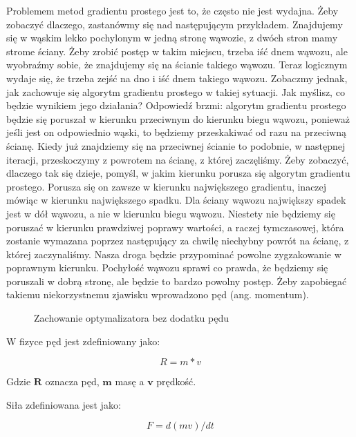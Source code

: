 Problemem metod gradientu prostego jest to, że często nie jest wydajna. Żeby zobaczyć dlaczego, zastanówmy się nad następującym przykładem. Znajdujemy się w wąskim lekko pochylonym w jedną stronę wąwozie, z dwóch stron mamy strome ściany. Żeby zrobić postęp w takim miejscu, trzeba iść dnem wąwozu, ale wyobraźmy sobie, że znajdujemy się na ścianie takiego wąwozu. Teraz logicznym wydaje się, że trzeba zejść na dno i iść dnem takiego wąwozu. Zobaczmy jednak, jak zachowuje się algorytm gradientu prostego w takiej sytuacji. Jak myślisz, co będzie wynikiem jego działania? Odpowiedź brzmi: algorytm gradientu prostego będzie się poruszał w kierunku przeciwnym do kierunku biegu wąwozu, ponieważ jeśli jest on odpowiednio wąski, to będziemy przeskakiwać od razu na przeciwną ścianę. Kiedy już znajdziemy się na przeciwnej ścianie to podobnie, w następnej iteracji, przeskoczymy z powrotem na ścianę, z której zaczęliśmy. Żeby zobaczyć, dlaczego tak się dzieje, pomyśl, w jakim kierunku porusza się algorytm gradientu prostego. Porusza się on zawsze w kierunku największego gradientu, inaczej mówiąc w kierunku największego spadku. Dla ściany wąwozu największy spadek jest w dół wąwozu, a nie w kierunku biegu wąwozu. Niestety nie będziemy się poruszać w kierunku prawdziwej poprawy wartości, a raczej tymczasowej, która zostanie wymazana poprzez następujący za chwilę niechybny powrót na ścianę, z której zaczynaliśmy. Nasza droga będzie przypominać powolne zygzakowanie w poprawnym kierunku. Pochyłość wąwozu sprawi co prawda, że będziemy się poruszali w dobrą stronę, ale będzie to bardzo powolny postęp. Żeby zapobiegać takiemu niekorzystnemu zjawisku wprowadzono pęd (ang. momentum).\newline

\clearpage
\begin{figure}[H]
\centering

\caption{Zachowanie optymalizatora bez dodatku pędu}
\end{figure}
\clearpage

\noindent W fizyce pęd jest zdefiniowany jako:

\begin{equation}
R = m * v
\end{equation}

\noindent Gdzie $\boldsymbol{R}$ oznacza pęd, $\boldsymbol{m}$ masę a $\boldsymbol{v}$ prędkość.\newline

\noindent Siła zdefiniowana jest jako:

\begin{equation}
F = d(mv) / dt
\end{equation}

